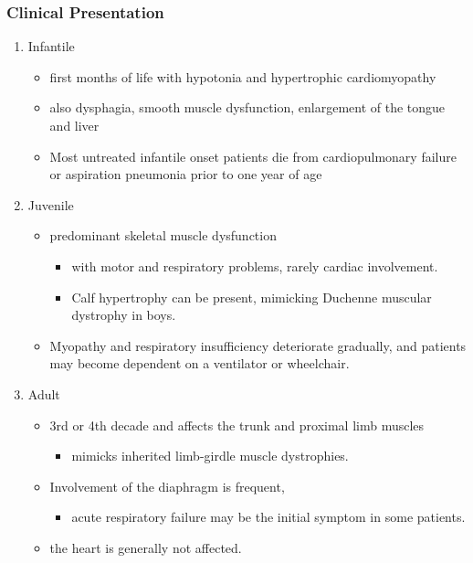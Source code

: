 \documentclass{scrartcl}
\begin{document}
\subsubsection{Clinical Presentation}
\label{sec:org9bd7d45}
\begin{enumerate}
\item Infantile
\label{sec:orgf1f681d}
\begin{itemize}
\item first months of life with hypotonia and hypertrophic cardiomyopathy
\item also dysphagia, smooth muscle dysfunction, enlargement of the tongue
and liver
\item Most untreated infantile onset patients die from cardiopulmonary
failure or aspiration pneumonia prior to one year of age
\end{itemize}
\item Juvenile
\label{sec:orgc31e9a6}
\begin{itemize}
\item predominant skeletal muscle dysfunction
\begin{itemize}
\item with motor and respiratory problems, rarely cardiac involvement.
\item Calf hypertrophy can be present, mimicking Duchenne muscular dystrophy in boys.
\end{itemize}
\item Myopathy and respiratory insufficiency deteriorate gradually, and patients may become dependent on a ventilator or wheelchair.
\end{itemize}
\item Adult
\label{sec:org1b3b380}
\begin{itemize}
\item 3rd or 4th decade and affects the trunk and proximal limb muscles
\begin{itemize}
\item mimicks inherited limb-girdle muscle dystrophies.
\end{itemize}
\item Involvement of the diaphragm is frequent,
\begin{itemize}
\item acute respiratory failure may be the initial symptom in some patients.
\end{itemize}
\item the heart is generally not affected.
\end{itemize}
\end{enumerate}
\end{document}
